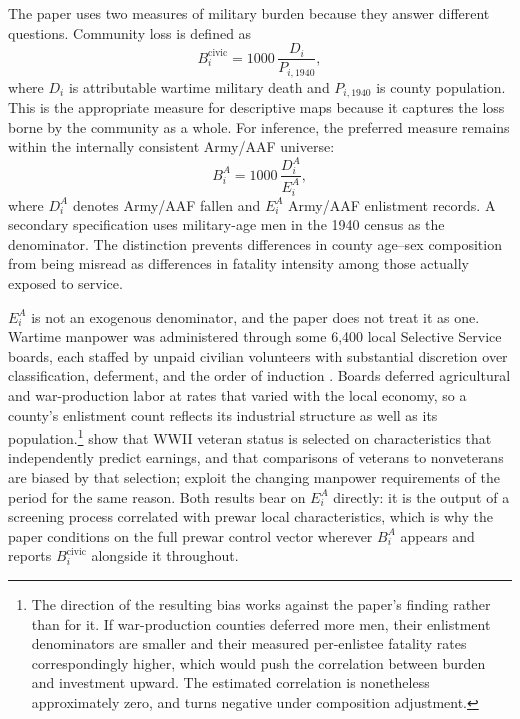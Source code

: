 \documentclass[12pt]{article}
\newcommand{\parencite}[1]{\citep{#1}}
\newcommand{\textcite}[1]{\citet{#1}}
\begin{document}
The paper uses two measures of military burden because they answer different questions. Community loss is defined as
\begin{equation}
B_i^{\mathrm{civic}}=1000\,\frac{D_i}{P_{i,1940}},
\end{equation}
where $D_i$ is attributable wartime military death and $P_{i,1940}$ is county population. This is the appropriate measure for descriptive maps because it captures the loss borne by the community as a whole. For inference, the preferred measure remains within the internally consistent Army/AAF universe:
\begin{equation}
B_i^{A}=1000\,\frac{D_i^{A}}{E_i^{A}},
\end{equation}
where $D_i^{A}$ denotes Army/AAF fallen and $E_i^{A}$ Army/AAF enlistment records. A secondary specification uses military-age men in the 1940 census as the denominator. The distinction prevents differences in county age--sex composition from being misread as differences in fatality intensity among those actually exposed to service.

$E_i^{A}$ is not an exogenous denominator, and the paper does not treat it as one. Wartime manpower was administered through some 6{,}400 local Selective Service boards, each staffed by unpaid civilian volunteers with substantial discretion over classification, deferment, and the order of induction \parencite{naraSSS,flynn1993}. Boards deferred agricultural and war-production labor at rates that varied with the local economy, so a county's enlistment count reflects its industrial structure as well as its population.\footnote{The direction of the resulting bias works against the paper's finding rather than for it. If war-production counties deferred more men, their enlistment denominators are smaller and their measured per-enlistee fatality rates correspondingly higher, which would push the correlation between burden and investment upward. The estimated correlation is nonetheless approximately zero, and turns negative under composition adjustment.} \textcite{angrist1994} show that WWII veteran status is selected on characteristics that independently predict earnings, and that comparisons of veterans to nonveterans are biased by that selection; \textcite{boundturner2002} exploit the changing manpower requirements of the period for the same reason. Both results bear on $E_i^{A}$ directly: it is the output of a screening process correlated with prewar local characteristics, which is why the paper conditions on the full prewar control vector wherever $B_i^{A}$ appears and reports $B_i^{\mathrm{civic}}$ alongside it throughout.
\end{document}
